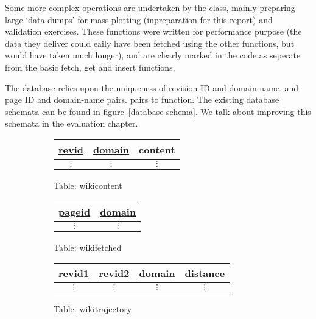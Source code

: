 Some more complex operations are undertaken by the class, mainly
preparing large `data-dumps' for mass-plotting (inpreparation for this
report) and validation exercises. These functions were written for
performance purpose (the data they deliver could eaily have been
fetched using the other functions, but would have taken much longer),
and are clearly marked in the code as seperate from the basic fetch,
get and insert functions. 

The database relies upon the uniqueness of revision ID and
domain-name, and page ID and domain-name pairs.  pairs to
function. The existing database schemata can be found in
figure~\ref{database-schema}. We talk about improving this schemata in
the evaluation chapter.

\begin{figure}
  \centering
  \begin{subfigure}[t]{0.3\linewidth}
    \centering
    \begin{tabular}{ccc}
      \toprule
      \underline{revid} & \underline{domain} & content\\
      \midrule
      $\vdots$ & $\vdots$ & $\vdots$\\
    \end{tabular}
    \caption{Table: wikicontent}
  \end{subfigure}
  \begin{subfigure}[t]{0.2\linewidth}
    \centering
    \begin{tabular}{cc}
      \toprule
      \underline{pageid} & \underline{domain} \\
      \midrule
      $\vdots$ & $\vdots$\\
    \end{tabular}
    \caption{Table: wikifetched}
  \end{subfigure}
  \begin{subfigure}[t]{0.4\linewidth}
    \centering
    \begin{tabular}{cccc}
      \toprule
      \underline{revid1} & \underline{revid2} & \underline{domain} & distance\\
      \midrule
      $\vdots$ & $\vdots$ & $\vdots$ & $\vdots$ \\
    \end{tabular}
    \caption{Table: wikitrajectory}
  \end{subfigure}\\
  \vspace{10 mm}
  \begin{subfigure}[b!]{\linewidth}
    \centering

\end{subfigure}
\end{figure}
